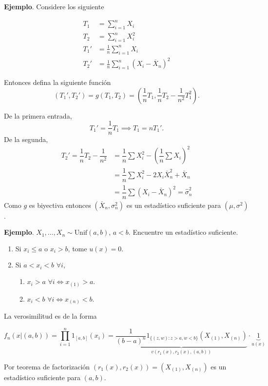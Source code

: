 \documentclass[
  12pt,
]{book}
\begin{document}
\textbf{Ejemplo}. Considere los siguiente

\begin{align*}
T_1 &= \sum_{i=1}^{n} X_i \\
T_2 &= \sum_{i=1}^{n} X_i^2 \\
T_1' & = \frac{1}{n} \sum_{i=1}^{n} X_i \\
T_2' &= \frac{1}{n} \sum_{i=1}^{n} (X_i - \overline{X}_n) ^{2}
\end{align*}

Entonces defina la siguiente función
\[
(T_1',T_2') = g(T_1,T_2) =
\left(\dfrac{1}{n}T_1,\dfrac{1}{n}T_2 - \dfrac{1}{n^2}T_1^2\right).
\]

De la primera entrada,
\[ T_1' = \dfrac 1n T_1 \implies T_1 = nT_1'.\]
De la segunda,
\begin{align*}
T_2' = \dfrac 1n T_2 - \dfrac 1{n^2} & = \dfrac 1n \sum X_i^2 - \left(\dfrac 1n \sum X_i\right)^2\\
& = \dfrac 1n \sum X_i^2 - 2X_i\bar X_n^2 + \bar X_n \\
& = \dfrac 1n \sum(X_i-\bar X_n)^2 = \hat\sigma_n^2
\end{align*}
Como \(g\) es biyectiva entonces \((\bar X_n, \sigma_n^2)\) es un estadístico suficiente para \((\mu,\sigma^2)\).

\textbf{Ejemplo}. \(X_1,\dots, X_n \sim \text{Unif}(a,b)\), \(a<b\). Encuentre un estadístico suficiente.

\begin{enumerate}
\def\labelenumi{\arabic{enumi}.}
\item
  Si \(x_i \leq a\) o \(x_i>b\), tome \(u(x) = 0\).
\item
  Si \(a< x_i <b\) \(\forall i\),

  \begin{enumerate}
  \def\labelenumii{\alph{enumii}.}
  \item
    \(x_i > a\) \(\forall i \Leftrightarrow x_{(1)}>a\).
  \item
    \(x_i < b\) \(\forall i \Leftrightarrow x_{(n)}<b\).
  \end{enumerate}
\end{enumerate}

La verosimilitud es de la forma

\[f_n(x|(a,b)) = \prod_{i=1}^n1_{[a,b]}(x_i) = \underbrace{\dfrac 1{(b-a)^n} 1_{\{(z,w): z>a, w<b\}}(X_{(1)},X_{(n)})}_{v(r_1(x),r_2(x),(a,b))}\cdot \underbrace{1}_{u(x)}\]

Por teorema de factorización \((r_{1}(x), r_{2}(x)) = (X_{(1)},X_{(n)})\) es un
estadístico suficiente para \((a,b)\).
\end{document}
